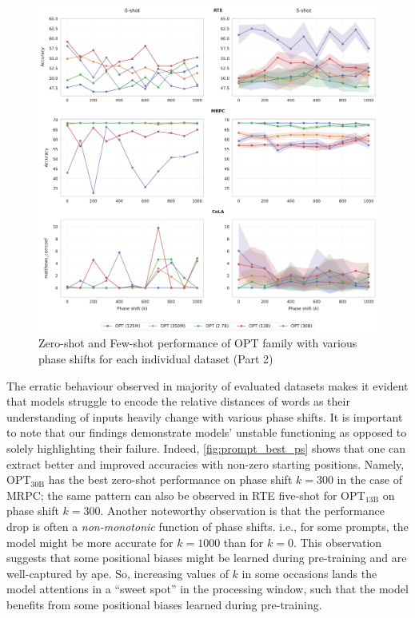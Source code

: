 \documentclass[letterpaper, 12pt]{report}
\begin{document}
\begin{figure}
    \centering
    \includegraphics[width=\textwidth]{figs/pos/v2_prompt_phase_shift_all_ds_part1.pdf}
    \caption{Zero-shot and Few-shot performance of OPT family with various phase shifts for each individual dataset (Part 2)}
    \label{fig:propmt_all_ds_part1}
\end{figure}



The erratic behaviour observed in majority of evaluated datasets makes it evident that models struggle to encode the relative distances of words as their understanding of inputs heavily change with various phase shifts.
It is important to note that our findings demonstrate models' unstable functioning as opposed to solely highlighting their failure. Indeed, \autoref{fig:prompt_best_ps} shows that one can extract better and improved accuracies with non-zero starting positions.
Namely, $\text{OPT}_{\text{30B}}$ has the best zero-shot performance on phase shift $k=300$ in the case of MRPC; the same pattern can also be observed in RTE five-shot for $\text{OPT}_{\text{13B}}$ on phase shift $k=300$.
Another noteworthy observation is that the performance drop is often a \emph{non-monotonic} function of phase shifts. i.e., for some prompts, the model might be more accurate for $k=1000$ than for $k=0$.
This observation suggests that some positional biases might be learned during pre-training and are well-captured by \acrshort{ape}. So, increasing values of $k$ in some occasions lands the model attentions in a ``sweet spot'' in the processing window, such that the model benefits from some positional biases learned during pre-training.
\end{document}
